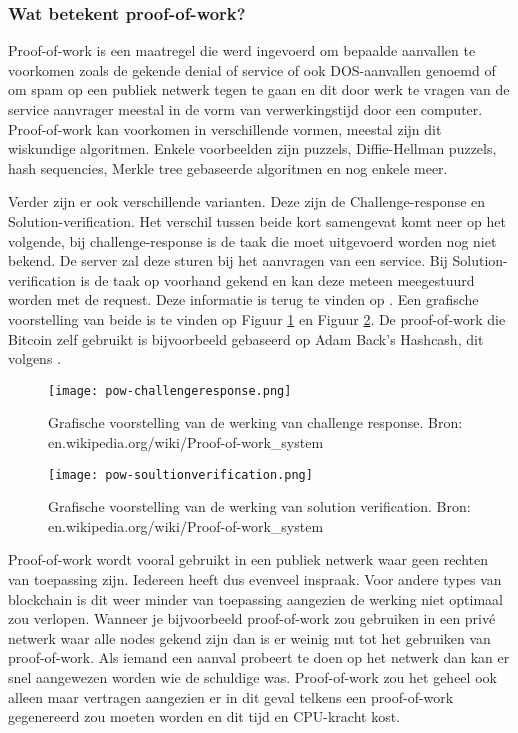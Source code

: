 \subsubsection{Wat betekent proof-of-work?}
Proof-of-work is een maatregel die werd ingevoerd om bepaalde aanvallen te voorkomen zoals de gekende denial of service of ook DOS-aanvallen genoemd of om spam op een publiek netwerk tegen te gaan en dit door werk te vragen van de service aanvrager meestal in de vorm van verwerkingstijd door een computer. Proof-of-work kan voorkomen in verschillende vormen, meestal zijn dit wiskundige algoritmen. Enkele voorbeelden zijn puzzels, Diffie-Hellman puzzels, hash sequencies, Merkle tree gebaseerde algoritmen en nog enkele meer. 

Verder zijn er ook verschillende varianten. Deze zijn de Challenge-response en Solution-verification. Het verschil tussen beide kort samengevat komt neer op het volgende, bij challenge-response is de taak die moet uitgevoerd worden nog niet bekend. De server zal deze sturen bij het aanvragen van een service. Bij Solution-verification is de taak op voorhand gekend en kan deze meteen meegestuurd worden met de request. Deze informatie is terug te vinden op  \textcite{Wikipedia-POW}. Een grafische voorstelling van beide is te vinden op Figuur \ref{fig:pow-challengeresponse} en Figuur \ref{fig:pow-solutionverification}. De proof-of-work die Bitcoin zelf gebruikt is bijvoorbeeld gebaseerd op Adam Back's Hashcash, dit volgens \textcite{Nakamoto2008}.

\begin{figure}
	\texttt{[image: pow-challengeresponse.png]}
	\caption{Grafische voorstelling van de werking van challenge response. Bron: en.wikipedia.org/wiki/Proof-of-work\_system}
	\label{fig:pow-challengeresponse}
\end{figure}

\begin{figure}
	\texttt{[image: pow-soultionverification.png]}
	\caption{Grafische voorstelling van de werking van solution verification. Bron: en.wikipedia.org/wiki/Proof-of-work\_system}
	\label{fig:pow-solutionverification}
\end{figure}

Proof-of-work wordt vooral gebruikt in een publiek netwerk waar geen rechten van toepassing zijn. Iedereen heeft dus evenveel inspraak. Voor andere types van blockchain is dit weer minder van toepassing aangezien de werking niet optimaal zou verlopen. Wanneer je bijvoorbeeld proof-of-work zou gebruiken in een privé netwerk waar alle nodes gekend zijn dan is er weinig nut tot het gebruiken van proof-of-work. Als iemand een aanval probeert te doen op het netwerk dan kan er snel aangewezen worden wie de schuldige was. Proof-of-work zou het geheel ook alleen maar vertragen aangezien er in dit geval telkens een proof-of-work gegenereerd zou moeten worden en dit tijd en CPU-kracht kost. 

